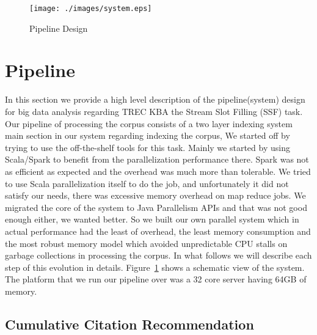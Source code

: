 
\begin{figure}[b]
\centering
\texttt{[image: ./images/system.eps]}
\vspace*{-.1in} \caption{Pipeline Design }\label{fig:system}
\vspace*{-.2in}
\end{figure}

\section{Pipeline}

In this section we provide a high level description of the pipeline(system) 
design for big data analysis regarding TREC KBA the Stream Slot Filling (SSF) 
task. Our pipeline of processing the corpus consists of a two layer indexing 
system main section in our system regarding indexing the corpus, We started 
off by trying to use the off-the-shelf tools for this task. Mainly we started 
by using Scala/Spark\cite{ferc11} to benefit from the parallelization 
performance there.  Spark was not as efficient as expected and the overhead 
was much more than tolerable. We tried to use Scala parallelization itself to 
do the job, and unfortunately it did not satisfy our needs, there was 
excessive memory overhead on map reduce jobs. We migrated the core of the 
system to Java Parallelism APIs and that was not good enough either, we wanted 
better. So we built our own parallel system which in actual performance had 
the least of overhead, the least memory consumption and the most robust memory 
model which avoided unpredictable CPU stalls on garbage collections in 
processing the corpus. In what follows we will describe each step of this 
evolution in details. Figure~\ref{fig:system} shows a schematic view of the 
system. The platform that we run our pipeline over was a 32 core server having 
64GB of memory.





\subsection{Cumulative Citation Recommendation}

